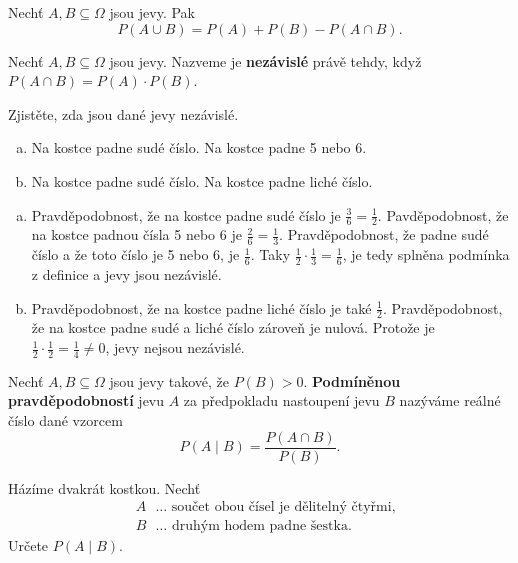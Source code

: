 \begin{veta}
    Nechť $A,B \subseteq \Omega$ jsou jevy. Pak
    $$P(A\cup B)=P(A)+P(B)-P(A\cap B).$$
\end{veta}

\begin{definition}
    Nechť $A,B \subseteq \Omega$ jsou jevy. Nazveme je \textbf{nezávislé} právě tehdy,
    když $P(A\cap B)=P(A)\cdot P(B).$
\end{definition}

\begin{priklad}
Zjistěte, zda jsou dané jevy nezávislé.
\begin{enumerate}[a.]
\item Na kostce padne sudé číslo. Na kostce padne 5 nebo 6.
\item Na kostce padne sudé číslo. Na kostce padne liché číslo.
\end{enumerate}
\end{priklad}

\begin{reseni}
\begin{enumerate}[a.]
	\item Pravděpodobnost, že na kostce padne sudé číslo je $\frac{3}{6}=\frac{1}{2}$. Pavděpodobnost,
	že na kostce padnou čísla 5 nebo 6 je $\frac{2}{6} = \frac{1}{3}$. Pravděpodobnost, že padne sudé číslo
	a že toto číslo je 5 nebo 6, je $\frac{1}{6}$. Taky $\frac{1}{2} \cdot \frac{1}{3}=\frac{1}{6}$, je tedy
	splněna podmínka z definice a jevy jsou nezávislé.
	\item Pravděpodobnost, že na kostce padne liché číslo je také $\frac{1}{2}$. Pravděpodobnost, že na kostce
	padne sudé a liché číslo zároveň je nulová. Protože je $\frac{1}{2}\cdot \frac{1}{2} = \frac{1}{4} \ne 0$,
	jevy nejsou nezávislé.
\end{enumerate}
\end{reseni}

\begin{definition}
    Nechť $A,B \subseteq \Omega$ jsou jevy takové, že $P(B)>0.$ \textbf{Podmíněnou
    pravděpodobností} jevu $A$ za předpokladu nastoupení jevu $B$ nazýváme reálné
    číslo dané vzorcem
    $$P(A\mid B) = \frac{P(A\cap B)}{P(B)}.$$
\end{definition}

\begin{priklad}
Házíme dvakrát kostkou. Nechť
\begin{align*}
    &A \textrm{ } \dots  \textrm{ součet obou čísel je dělitelný čtyřmi,}\\
    &B \textrm{ } \dots  \textrm{ druhým hodem padne šestka}.
\end{align*}
Určete $P(A\mid B).$
\end{priklad}

